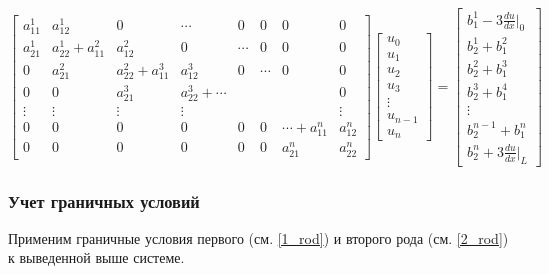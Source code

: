 $$ \begin{bmatrix}
a_{11}^1     &   a_{12}^1         &   0 & \cdots & 0 & 0 & 0  & 0\\
a_{21}^1     &    a_{22}^1+a_{11}^2 & a_{12}^2  & 0 & \cdots & 0 & 0  & 0\\
0     &    a_{21}^2 & a_{22}^2+a_{11}^3  &  a_{12}^3  & 0 & \cdots & 0  & 0\\
0     &    0  & a_{21}^3  & a_{22}^3+ \cdots  &  & &   & 0\\
\vdots & \vdots & \vdots & \vdots &  &  &   & \vdots\\
0 & 0 & 0 & 0 &  0 & 0 & \cdots+a_{11}^n  & a_{12}^n\\
0 & 0 & 0 & 0 &  0 & 0 & a_{21}^n  & a_{22}^n
\end{bmatrix}
\begin{bmatrix}
u_0 \\
u_1 \\
u_2\\
u_3\\
\vdots\\
u_{n-1}\\
u_n
\end{bmatrix} =
\begin{bmatrix}
b_1^1   -3  \frac{du}{dx}|_0 \\
b_2^1+b_1^2\\
b_2^2+b_1^3\\
b_2^3+b_1^4\\
\vdots\\
b_2^{n-1}+b_1^n\\
b_2^n   +3  \frac{du}{dx}|_L
\end{bmatrix}
$$

\subsubsection{Учет граничных условий}

Применим граничные условия первого (см. \ref{1_rod}) и второго рода (см. \ref{2_rod}) к выведенной выше системе.

